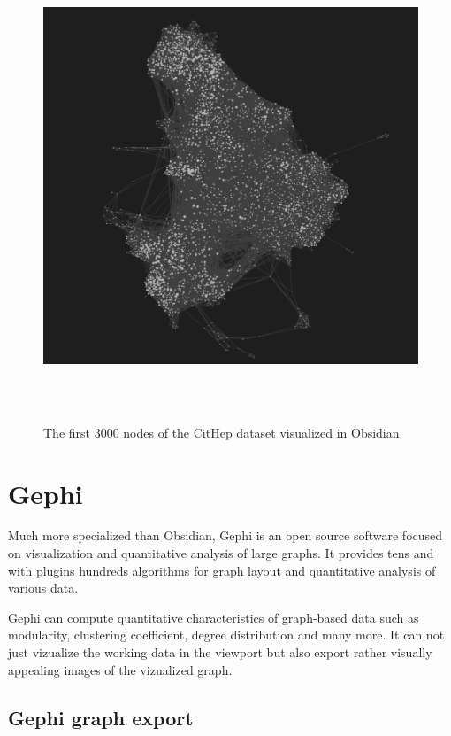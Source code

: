 \begin{figure}[p]\centering
  \includegraphics[width=140mm, height=140mm]{img/Obsidian_3000}
  \caption{The first 3000 nodes of the CitHep dataset visualized in Obsidian}
  \label{obr:obsidian_3000}
\end{figure}

\section{Gephi}

Much more specialized than Obsidian, Gephi is an open source software focused on visualization and quantitative analysis of large graphs.
It provides tens and with plugins hundreds  algorithms for graph layout and quantitative analysis of various data.

Gephi can compute quantitative characteristics of graph-based data such as modularity, clustering coefficient, degree distribution and many more.
It can not just vizualize the working data in the viewport but also export rather visually appealing images of the vizualized graph.

\subsection{Gephi graph export}


